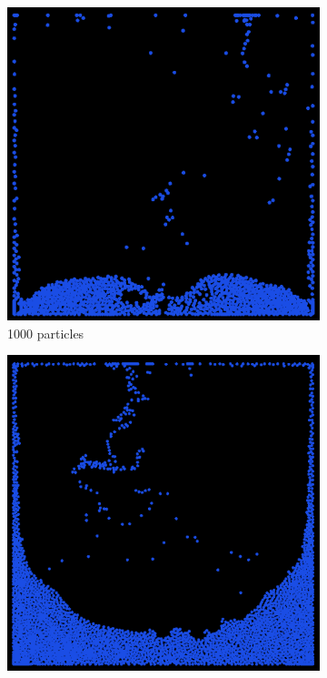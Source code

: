 \begin{figure}[h]
\begin{subfigure}[b]{0.2\textwidth}
        \includegraphics[width=\textwidth]{figures/apic1000.png}
        \caption{1000 particles}
    \end{subfigure}
    \begin{subfigure}[b]{0.2\textwidth}
        \includegraphics[width=\textwidth]{figures/apic4000.png}

\end{subfigure}
\end{figure}
